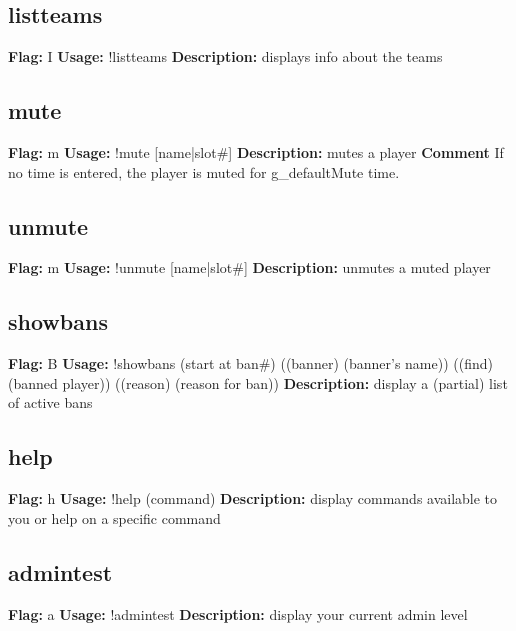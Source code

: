 \subsection{listteams}
\textbf{Flag:} \hfill I \linebreak\textbf{Usage:} \hfill !listteams  \linebreak
\textbf{Description:} \hfill displays info about the teams

\subsection{mute}
\textbf{Flag:} \hfill m \linebreak\textbf{Usage:} \hfill !mute [name|slot\#] \linebreak
\textbf{Description:} \hfill mutes a player
\linebreak
\textbf{Comment} \hfill If no time is entered, the player is muted for g\_defaultMute time. 

\subsection{unmute}
\textbf{Flag:} \hfill m \linebreak\textbf{Usage:} \hfill !unmute [name|slot\#] \linebreak
\textbf{Description:} \hfill unmutes a muted player

\subsection{showbans}
\textbf{Flag:} \hfill B \linebreak\textbf{Usage:} \hfill !showbans (start at ban\#) ((banner) (banner's name)) ((find) (banned player)) ((reason) (reason for ban)) \linebreak
\textbf{Description:} \hfill display a (partial) list of active bans

\subsection{help}
\textbf{Flag:} \hfill h \linebreak\textbf{Usage:} \hfill !help (command) \linebreak
\textbf{Description:} \hfill display commands available to you or help on a specific command

\subsection{admintest}
\textbf{Flag:} \hfill a \linebreak\textbf{Usage:} \hfill !admintest  \linebreak
\textbf{Description:} \hfill display your current admin level

